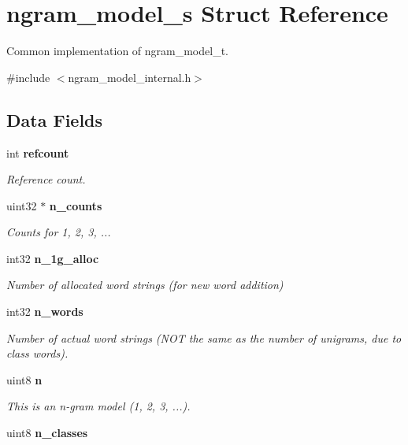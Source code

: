 \section{ngram\-\_\-model\-\_\-s Struct Reference}
\label{structngram__model__s}


Common implementation of ngram\-\_\-model\-\_\-t.  




{\ttfamily \#include $<$ngram\-\_\-model\-\_\-internal.\-h$>$}

\subsection*{Data Fields}
\begin{DoxyCompactItemize}
\item 
int {\bf refcount}\label{structngram__model__s_a3b14986e4dc40ccec1f7e206b7f41d06}

\begin{DoxyCompactList}\small\item\em Reference count. \end{DoxyCompactList}\item 
uint32 $\ast$ {\bf n\-\_\-counts}
\begin{DoxyCompactList}\small\item\em Counts for 1, 2, 3, ... \end{DoxyCompactList}\item 
int32 {\bf n\-\_\-1g\-\_\-alloc}\label{structngram__model__s_a3e41109b30668bdfc077614c1ef49960}

\begin{DoxyCompactList}\small\item\em Number of allocated word strings (for new word addition) \end{DoxyCompactList}\item 
int32 {\bf n\-\_\-words}
\begin{DoxyCompactList}\small\item\em Number of actual word strings (N\-O\-T the same as the number of unigrams, due to class words). \end{DoxyCompactList}\item 
uint8 {\bf n}
\begin{DoxyCompactList}\small\item\em This is an n-\/gram model (1, 2, 3, ...). \end{DoxyCompactList}\item 
uint8 {\bf n\-\_\-classes}\label{structngram__model__s_adeb914f8e9f011a5c960f5ee9cd33919}


\end{DoxyCompactItemize}
